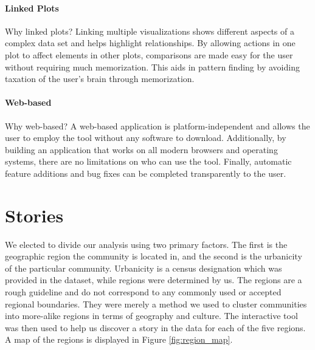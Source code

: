\documentclass[11pt]{article}\usepackage{knitr}
\begin{document}
\paragraph{Linked Plots}
Why linked plots? Linking multiple visualizations shows different aspects of a complex data set and helps highlight relationships. By allowing actions in one plot to affect elements in other plots, comparisons are made easy for the user without requiring much memorization. This aids in pattern finding by avoiding taxation of the user's brain through memorization.

\paragraph{Web-based}
Why web-based? A web-based application is platform-independent and allows the user to employ the tool without any software to download. Additionally, by building an application that works on all modern browsers and operating systems, there are no limitations on who can use the tool. Finally, automatic feature additions and bug fixes can be completed transparently to the user.


\section*{Stories}

We elected to divide our analysis using two primary factors. The first is the geographic region the community is located in, and the second is the urbanicity of the particular community. Urbanicity is a census designation which was provided in the dataset, while regions were determined by us. The regions are a rough guideline and do not correspond to any commonly used or accepted regional boundaries. They were merely a method we used to cluster communities into more-alike regions in terms of geography and culture. The interactive tool was then used to help us discover a story in the data for each of the five regions. A map of the regions is displayed in Figure \ref{fig:region_map}.
\end{document}
